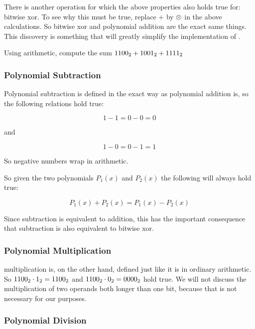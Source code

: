 There is another operation for which the above properties also holds
true for: bitwise xor. To see why this must be true, replace $+$ by
$\mathrel{\otimes}$ in the above calculations. So bitwise xor and polynomial
addition are the exact same things. This discovery is something that
will greatly simplify the implementation of \crc.

\begin{Exercise}[label={poly-add}]
  Using \crc arithmetic, compute the sum  $\mbox{\ensuremath{1100_2}} + \mbox{\ensuremath{1001_2}} + \mbox{\ensuremath{1111_2}}$
\end{Exercise}

\subsubsection{Polynomial Subtraction}

Polynomial subtraction is defined in the exact way as polynomial
addition is, so the following relations hold true:

\begin{equation*}
  1 - 1 = 0 - 0 = 0
\end{equation*}

and

\begin{equation*}
  1 - 0 = 0 - 1 = 1
\end{equation*}

So negative numbers wrap in \crc arithmetic.

So given the two polynomials $P_1(x)$ and $P_2(x)$ the following will
always hold true:

\begin{equation*}
  P_1(x) + P_2(x) = P_1(x) - P_2(x)
\end{equation*}


Since subtraction is equivalent to addition, this has the important
consequence that subtraction is also equivalent to bitwise xor.

\subsubsection{Polynomial Multiplication}

\crc multiplication is, on the other hand, defined just like it is in
ordinary arithmetic. So $\mbox{\ensuremath{1100_2}} \cdot \mbox{\ensuremath{1_2}} = \mbox{\ensuremath{1100_2}}$ and $\mbox{\ensuremath{1100_2}} \cdot \mbox{\ensuremath{0_2}} =
\mbox{\ensuremath{0000_2}}$ hold true. We will not discuss the multiplication of two
operands both longer than one bit, because that is not necessary for
our purposes.

\subsubsection{Polynomial Division}

